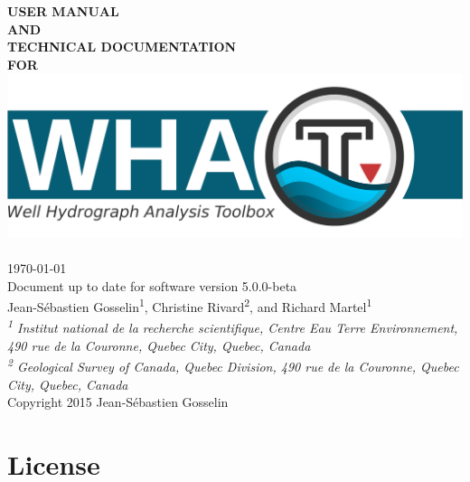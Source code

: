 \documentclass[WHATMANUAL.tex]{subfiles}
\begin{document}
\hypersetup{pageanchor=false}
\begin{titlepage}
\begin{center}


\textbf{\fontsize{30}{36}\selectfont USER MANUAL}\\[1.0cm]
\textbf{\fontsize{30}{36}\selectfont AND}\\[1.0cm]
\textbf{\fontsize{30}{36}\selectfont TECHNICAL DOCUMENTATION}\\[1.0cm]
\textbf{\fontsize{30}{36}\selectfont FOR}\\

\includegraphics[width=1\textwidth]{WHAT_banner}~\\[2cm]

{\Large \today}\\[0.5cm]
{\Large Document up to date for software version 5.0.0-beta}\\[2cm]

{\large Jean-S\'ebastien Gosselin\textsuperscript{1}, Christine Rivard\textsuperscript{2}, and Richard Martel\textsuperscript{1}}\\[0.25cm]

\textit{{\small\textsuperscript{1} Institut national de la recherche scientifique, Centre Eau Terre Environnement, 490 rue de la Couronne, Quebec City, Quebec, Canada}}\\[0.1cm]

\textit{{\small\textsuperscript{2} Geological Survey of Canada, Quebec Division, 490 rue de la Couronne, Quebec City, Quebec, Canada}}\\[2cm]

{Copyright 2015 Jean-S\'ebastien Gosselin}

\end{center}
\end{titlepage}
\hypersetup{pageanchor=true}
\chapter*{License}
\end{document}
